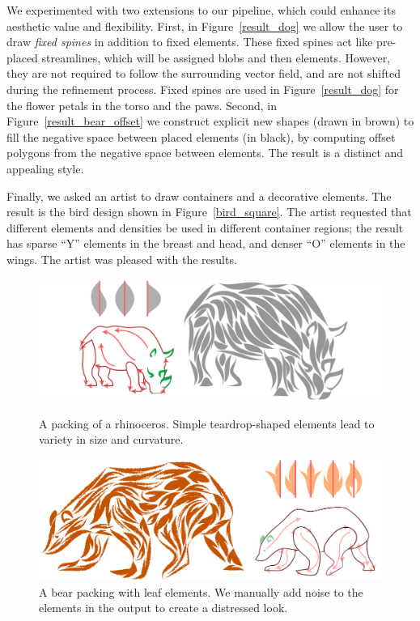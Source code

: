 We experimented with two extensions to our pipeline, 
which could enhance its aesthetic value and flexibility.
First, in Figure~\ref{result_dog} we allow the user to draw 
\textit{fixed spines} in addition to fixed elements.  These fixed
spines act like pre-placed streamlines, which will be assigned blobs
and then elements.  However, they are not required to follow the
surrounding vector field, and are not shifted during the refinement
process.  Fixed spines are used in Figure~\ref{result_dog} for the 
flower petals in the torso and the paws.
Second, in Figure~\ref{result_bear_offset} we construct explicit new shapes
(drawn in brown)
to fill the negative space between placed elements (in black), 
by computing offset polygons from the negative space between elements. 
The result is a distinct and appealing style.  

Finally, we asked an artist to draw containers and a decorative elements.
The result is the bird design shown in Figure~\ref{bird_square}.
The artist requested that different elements and densities be used in 
different container regions; the result has sparse ``Y'' elements in 
the breast and head, and denser ``O'' elements in the wings. The artist was pleased with the results.


\begin{figure}
\centering
\includegraphics[width=1.0\textwidth]{figures/flowpak/result_02.pdf} %
\caption[A packing of a rhinoceros]
{\label{result_rhino}
A packing of a rhinoceros.  Simple teardrop-shaped 
elements lead to variety in size and curvature.}
\bigskip
\includegraphics[width=1.0\textwidth]{figures/flowpak/bear_leaves.pdf} %
\caption[A packing of a bear with leaf elements]
{\label{result_bear_leaves}
  A bear packing with leaf elements.  We manually add noise to the 
  elements in the output to create a distressed look.}
\end{figure}

